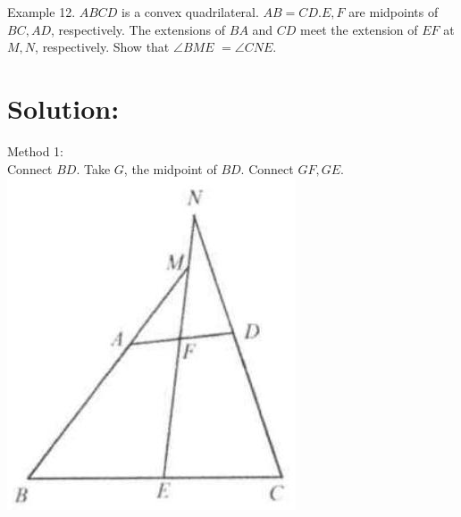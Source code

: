 \documentclass[10pt]{article}
\begin{document}
Example 12. \(A B C D\) is a convex quadrilateral. \(A B=C D . E, F\) are midpoints of \(B C, A D\), respectively. The extensions of \(B A\) and \(C D\) meet the extension of \(E F\) at \(M, N\), respectively. Show that \(\angle B M E\) \(=\angle C N E\).

\section*{Solution:}
Method 1:\\
Connect \(B D\). Take \(G\), the midpoint of \(B D\). Connect \(G F, G E\).\\
\includegraphics[max width=\textwidth, center]{2025_04_17_97bc1f7e44d93c271a88g-042(2)}
\end{document}
